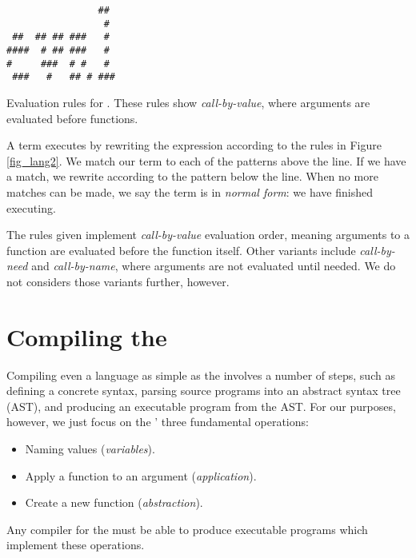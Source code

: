 \documentclass[12pt]{report}
\begin{document}
\begin{myfig}[bt]
\begin{minipage}{2in}
\begin{Verbatim}
                ##  
                 #  
 ##  ## ## ###   #  
####  # ## ###   #  
#     ###  # #   #  
 ###   #   ## # ### 
\end{Verbatim}
\end{minipage}
  \caption{Evaluation rules for \lamA. These rules show 
    \emph{call-by-value}, where arguments are evaluated
    before functions.}
  \label{fig_lang2}
\end{myfig}

A \lamA term executes by rewriting the expression according to the
rules in Figure \ref{fig_lang2}. We match our term to each of the
patterns above the line. If we have a match, we rewrite according to
the pattern below the line. When no more matches can be made, we say
the term is in \emph{normal form}: we have finished executing.

The rules given implement \emph{call-by-value} evaluation order,
meaning arguments to a function are evaluated before the function
itself. Other variants include \emph{call-by-need} and
\emph{call-by-name}, where arguments are not evaluated until
needed. We do not considers those variants further, however.

\section{Compiling the \LamA}
\label{sec_lang1}

Compiling even a language as simple as the \lamA involves a number of
steps, such as defining a concrete syntax, parsing source programs
into an abstract syntax tree (AST), and producing an executable
program from the AST. For our purposes, however, we just focus on the
\lamA' three fundamental operations:

\begin{itemize}
\item Naming values (\emph{variables}).
\item Apply a function to an argument (\emph{application}).
\item Create a new function (\emph{abstraction}). 
\end{itemize}

Any compiler for the \lamA must be able to produce executable programs
which implement these operations. 
\end{document}
